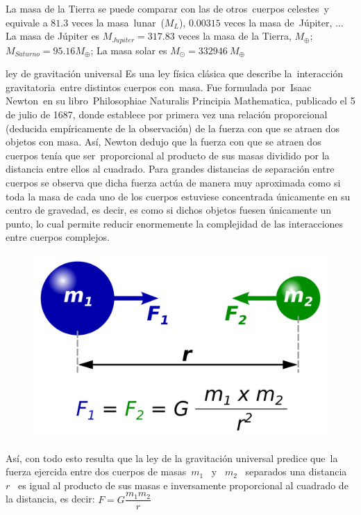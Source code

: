 La masa de la Tierra se puede comparar con las de otros cuerpos celestes y equivale a $81.3$ veces la masa lunar ($M_L$), $0.00315$ veces la masa de Júpiter, ...
La masa de Júpiter es $M_{Jupiter}=317.83$ veces la masa de la Tierra, $M_\oplus$;  $M_{Saturno}=95.16 M_\oplus$; La masa solar es $M_\odot=332946\ M_\oplus$







\newpage %
\begin{myblock}{ley de gravitación universal}
Es una ley física clásica que describe la interacción gravitatoria entre distintos cuerpos con masa. Fue formulada por Isaac Newton en su libro Philosophiae Naturalis Principia Mathematica, publicado el 5 de julio de 1687, donde establece por primera vez una relación proporcional (deducida empíricamente de la observación) de la fuerza con que se atraen dos objetos con masa. Así, Newton dedujo que la fuerza con que se atraen dos cuerpos tenía que ser proporcional al producto de sus masas dividido por la distancia entre ellos al cuadrado. Para grandes distancias de separación entre cuerpos se observa que dicha fuerza actúa de manera muy aproximada como si toda la masa de cada uno de los cuerpos estuviese concentrada únicamente en su centro de gravedad, es decir, es como si dichos objetos fuesen únicamente un punto, lo cual permite reducir enormemente la complejidad de las interacciones entre cuerpos complejos.

\begin{figure}[H]
	\centering
	\includegraphics[width=.75\textwidth]{imagenes/imagenes14/T14IM03.png}
\end{figure}

Así, con todo esto resulta que la ley de la gravitación universal predice que la fuerza ejercida entre dos cuerpos de masas $m_1$  y  $m_2$  separados una distancia $r$  es igual al producto de sus masas e inversamente proporcional al cuadrado de la distancia, es decir:
$F=G\dfrac {m_1m_2}{r}$	
\end{myblock}
